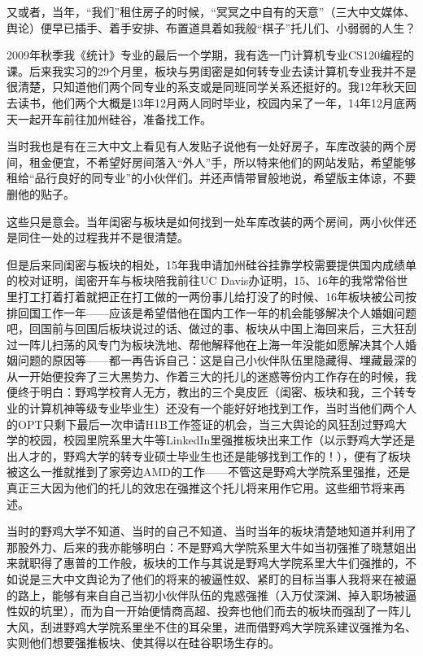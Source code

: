 \documentclass[9pt, b5paper]{article}
\begin{document}
又或者，当年，“我们”租住房子的时候，“冥冥之中自有的天意”（三大中文媒体、舆论）便早已插手、着手安排、布置道具着如我般“棋子”托儿们、小弱弱的人生？

2009年秋季我《统计》专业的最后一个学期，我有选一门计算机专业CS120编程的课。后来我实习的29个月里，板块与男闺密是如何转专业去读计算机专业我并不是很清楚，只知道他们两个同专业的系支或是同班同学关系还挺好的。我12年秋天回去读书，他们两个大概是13年12月两人同时毕业，校园内呆了一年，14年12月底两天一起开车前往加州硅谷，准备找工作。 

当时我也是有在三大中文上看见有人发贴子说他有一处好房子，车库改装的两个房间，租金便宜，不希望好房间落入“外人”手，所以特来他们的网站发贴，希望能够租给“品行良好的同专业”的小伙伴们。并还声情带冒般地说，希望版主体谅，不要删他的贴子。 

这些只是意会。当年闺密与板块是如何找到一处车库改装的两个房间，两小伙伴还是同住一处的过程我并不是很清楚。

但是后来同闺密与板块的相处，15年我申请加州硅谷挂靠学校需要提供国内成绩单的校对证明，闺密开车与板块陪我前往UC Davis办证明，15、16年的我常常俗世里打工打着打着就把正在打工做的一两份事儿给打没了的时候、16年板块被公司按排回国工作一年——应该是希望借他在国内工作一年的机会能够解决个人婚姻问题吧，回国前与回国后板块说过的话、做过的事、板块从中国上海回来后，三大狂刮过一阵儿扫荡的风专门为板块洗地、帮他解释他在上海一年没能如愿解决其个人婚姻问题的原因等——都一再告诉自己：这是自己小伙伴队伍里隐藏得、埋藏最深的从一开始便投奔了三大黑势力、作着三大的托儿的迷惑等份内工作存在的时候，我便终于明白：野鸡学校育人无方，教出的三个臭皮匠（闺密、板块和我，三个转专业的计算机神等级专业毕业生）还没有一个能好好地找到工作，当时当他们两个人的OPT只剩下最后一次申请H1B工作签证的机会，当三大舆论的风狂刮过野鸡大学的校园，校园里院系里大牛等LinkedIn里强推板块出来工作（以示野鸡大学还是出人才的，野鸡大学的转专业硕士毕业生也还是能够找到工作的！），便有了板块被这么一推就推到了家旁边AMD的工作——不管这是野鸡大学院系里强推，还是真正三大因为他们的托儿的效忠在强推这个托儿将来用作它用。这些细节将来再述。

当时的野鸡大学不知道、当时的自己不知道、当时当年的板块清楚地知道并利用了那股外力、后来的我亦能够明白：不是野鸡大学院系里大牛如当初强推了晓慧姐出来就职得了惠普的工作般，板块的工作与其说是野鸡大学院系里大牛们强推的，不如说是三大中文舆论为了他们的将来的被逼性奴、紧盯的目标当事人我将来在被逼的路上，能够有来自自己当初小伙伴队伍的鬼惑强推（入万仗深渊、掉入职场被逼性奴的坑里），而为自一开始便情商高超、投奔也他们而去的板块而强刮了一阵儿大风，刮进野鸡大学院系里坐不住的耳朵里，进而借野鸡大学院系建议强推为名、实则他们想要强推板块、使其得以在硅谷职场生存的。
\end{document}
